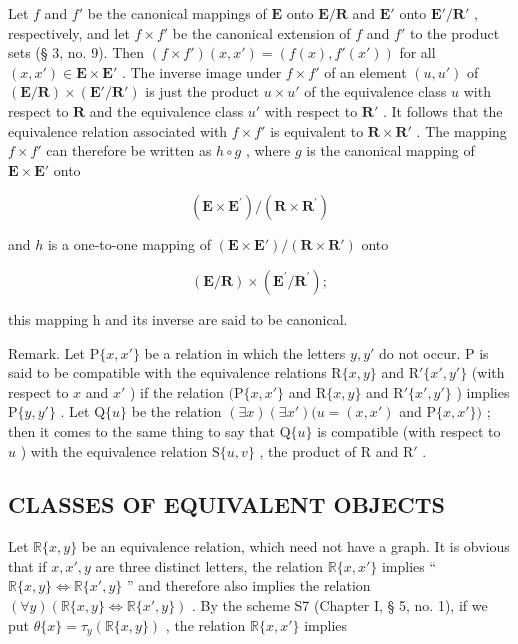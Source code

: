 Let \(f\) and \(f'\) be the canonical mappings of \(\mathbf{E}\) onto \(\mathbf{E}/\mathbf{R}\) and \(\mathbf{E}'\) onto \(\mathbf{E}'/\mathbf{R}'\) , respectively, and let \(f \times f'\) be the canonical extension of \(f\) and \(f'\) to the product sets (§ 3, no. 9). Then \((f \times f')(x, x') = (f(x), f'(x'))\) for all \((x, x') \in \mathbf{E} \times \mathbf{E}'\) . The inverse image under \(f \times f'\) of an element \((u, u')\) of \((\mathbf{E}/\mathbf{R}) \times (\mathbf{E}'/\mathbf{R}')\) is just the product \(u \times u'\) of the equivalence class \(u\) with respect to \(\mathbf{R}\) and the equivalence class \(u'\) with respect to \(\mathbf{R}'\) . It follows that the equivalence relation associated with \(f \times f'\) is equivalent to \(\mathbf{R} \times \mathbf{R}'\) . The mapping \(f \times f'\) can therefore be written as \(h \circ g\) , where \(g\) is the canonical mapping of \(\mathbf{E} \times \mathbf{E}'\) onto

\[
(\mathbf {E} \times \mathbf {E} ^ {\prime}) / (\mathbf {R} \times \mathbf {R} ^ {\prime})
\]

and \(h\) is a one-to-one mapping of \((\mathbf{E} \times \mathbf{E}') / (\mathbf{R} \times \mathbf{R}')\) onto

\[
(\mathbf {E} / \mathbf {R}) \times (\mathbf {E} ^ {\prime} / \mathbf {R} ^ {\prime});
\]

this mapping h and its inverse are said to be canonical.

Remark. Let \(\mathrm{P}\{x, x'\}\) be a relation in which the letters \(y, y'\) do not occur. P is said to be compatible with the equivalence relations \(\mathrm{R}\{x, y\}\) and \(\mathrm{R}'\{x', y'\}\) (with respect to \(x\) and \(x'\) ) if the relation \((\mathrm{P}\{x, x'\}\) and \(\mathrm{R}\{x, y\}\) and \(\mathrm{R}'\{x', y'\}\) ) implies \(\mathrm{P}\{y, y'\}\) . Let \(\mathrm{Q}\{u\}\) be the relation \((\exists x)(\exists x')(u = (x, x')\) and \(\mathrm{P}\{x, x'\})\) ; then it comes to the same thing to say that \(\mathrm{Q}\{u\}\) is compatible (with respect to \(u\) ) with the equivalence relation \(\mathrm{S}\{u, v\}\) , the product of R and \(\mathrm{R}'\) .

\subsection{CLASSES OF EQUIVALENT OBJECTS}

Let \(\mathbb{R}\{x, y\}\) be an equivalence relation, which need not have a graph. It is obvious that if \(x, x', y\) are three distinct letters, the relation \(\mathbb{R}\{x, x'\}\) implies `` \(\mathbb{R}\{x, y\} \Longleftrightarrow \mathbb{R}\{x', y\}\) '' and therefore also implies the relation \((\forall y)(\mathbb{R}\{x, y\} \Longleftrightarrow \mathbb{R}\{x', y\})\) . By the scheme S7 (Chapter I, § 5, no. 1), if we put \(\theta\{x\} = \tau_y(\mathbb{R}\{x, y\})\) , the relation \(\mathbb{R}\{x, x'\}\) implies

